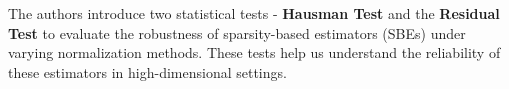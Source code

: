 The authors introduce two statistical tests - \textbf{Hausman Test} and the \textbf{Residual Test} to evaluate the robustness of sparsity-based estimators (SBEs) under varying normalization methods. These tests help us understand the reliability of these estimators in high-dimensional settings. 
